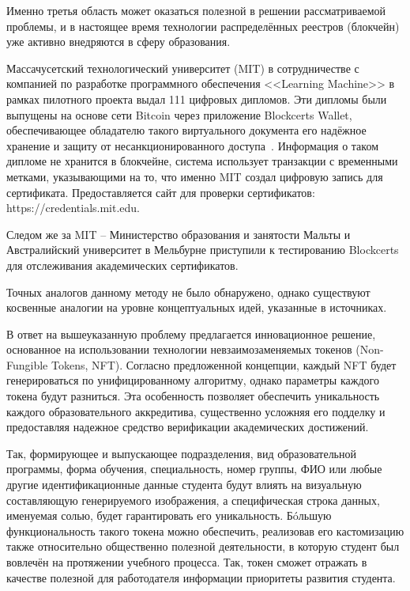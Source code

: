 \documentclass{mirea-article}
\begin{document}
Именно третья область может оказаться полезной в решении рассматриваемой проблемы, и в настоящее время технологии распределённых реестров (блокчейн) уже активно внедряются в сферу образования.~\cite{bib:blokchejn-v-obrazovanii, bib:blokcheyn-v-uchebnom-protsesse}

Массачусетский технологический университет (MIT) в сотрудничестве с компанией по разработке программного обеспечения <<Learning Machine>> в рамках пилотного проекта выдал 111 цифровых дипломов. Эти дипломы были выпущены на основе сети Bitcoin через приложение Blockcerts Wallet, обеспечивающее обладателю такого виртуального документа его надёжное хранение и защиту от несанкционированного доступа~\cite{bib:mit-diplomas}. Информация о таком дипломе не хранится в блокчейне, система использует транзакции с временными метками, указывающими на то, что именно MIT создал цифровую запись для сертификата. Предоставляется сайт для проверки сертификатов: https://credentials.mit.edu.

Следом же за MIT – Министерство образования и занятости Мальты и Австралийский университет в Мельбурне приступили к тестированию Blockcerts для отслеживания академических сертификатов.

Точных аналогов данному методу не было обнаружено, однако существуют косвенные аналогии на уровне концептуальных идей, указанные в источниках.~\cite{bib:nfts-replace-diplomas, bib:nfts-and-higher-education}

В ответ на вышеуказанную проблему предлагается инновационное решение, основанное на использовании технологии невзаимозаменяемых токенов (Non-Fungible Tokens, NFT). Согласно предложенной концепции, каждый NFT будет генерироваться по унифицированному алгоритму, однако параметры каждого токена будут разниться. Эта особенность позволяет обеспечить уникальность каждого образовательного аккредитива, существенно усложняя его подделку и предоставляя надежное средство верификации академических достижений.

Так, формирующее и выпускающее подразделения, вид образовательной программы, форма обучения, специальность, номер группы, ФИО или любые другие идентификационные данные студента будут влиять на визуальную составляющую генерируемого изображения, а специфическая строка данных, именуемая солью, будет гарантировать его уникальность. Бóльшую функциональность такого токена можно обеспечить, реализовав его кастомизацию также относительно общественно полезной деятельности, в которую студент был вовлечён на протяжении учебного процесса. Так, токен сможет отражать в качестве полезной для работодателя информации приоритеты развития студента.
\end{document}
